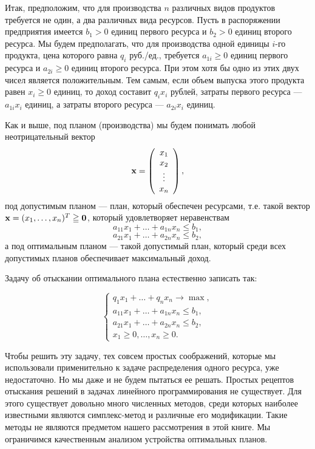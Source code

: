     Итак, предположим, что для производства $n$ различных видов
    продуктов требуется не один, а два различных вида
    ресурсов. Пусть в распоряжении
    предприятия имеется $b_{1}>0$ единиц первого ресурса и $b_{2}>0$
    единиц второго ресурса. Мы будем
    предполагать, что для производства одной единицы $i$-го
    продукта, цена которого равна $q_{i}$ руб./ед.,
    требуется $a_{1i}\geqslant0$ единиц первого ресурса и
    $a_{2i}\geqslant0$ единиц второго ресурса. При этом хотя бы одно из
    этих двух чисел является положительным.
    Тем самым, если объем выпуска этого продукта равен
    $x_{i}\geqslant0$ единиц, то доход составит $q_{i}x_{i}$ рублей,
    затраты первого ресурса --- $a_{1i}x_{i}$ единиц, а затраты
    второго ресурса --- $a_{2i}x_{i}$ единиц.

    Как и выше, под планом (производства) мы будем понимать любой
    неотрицательный вектор
\[\mathbf{x}=\left(
     \begin{array}{c}
        x_{1} \\
        x_{2} \\
        \vdots \\
        x_{n}  \\
      \end{array}
\right),\]
    под допустимым планом --- план, который обеспечен ресурсами,
    т.е. такой вектор $\mathbf{x}=(x_{1},\ldots,x_{n})^{T}\geqq\mathbf{0}$, который удовлетворяет неравенствам
    \[a_{11}x_{1}+\ldots+a_{1n}x_{n}\leqslant b_{1}, \]
    \[a_{21}x_{1}+\ldots+a_{2n}x_{n}\leqslant b_{2},\]
    а под оптимальным планом --- такой допустимый план, который
    среди всех допустимых планов обеспечивает максимальный доход.




    Задачу об отыскании оптимального плана естественно записать так:

\begin{equation}
    \label{LP1}
\left\{
\begin{array}{l}
  q_{1}x_{1}+\ldots+q_{n}x_{n}\rightarrow\max, \\
  a_{11}x_{1}+\ldots+a_{1n}x_{n}\leqslant b_{1}, \\
  a_{21}x_{1}+\ldots+a_{2n}x_{n}\leqslant b_{2},\\
  x_{1}\geqslant0, \ldots, x_{n}\geqslant0.
\end{array}
\right.
\end{equation}

    Чтобы решить эту задачу, тех совсем простых соображений, которые
    мы использовали применительно к задаче распределения одного ресурса,
    уже недостаточно. Но мы даже и не будем
    пытаться ее решать. Простых рецептов отыскания решений в задачах
    линейного программирования не существует. Для этого существует
    довольно много численных методов, среди
    которых наиболее известными являются симплекс-метод и различные
    его модификации. Такие методы не являются предметом нашего
    рассмотрения в этой книге. Мы ограничимся качественным
    анализом устройства оптимальных планов.

